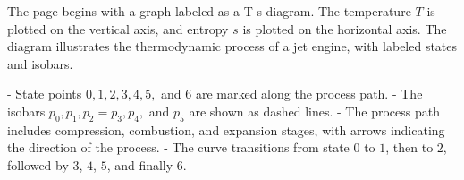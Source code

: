 The page begins with a graph labeled as a T-s diagram. The temperature \( T \) is plotted on the vertical axis, and entropy \( s \) is plotted on the horizontal axis. The diagram illustrates the thermodynamic process of a jet engine, with labeled states and isobars.  

- State points \( 0, 1, 2, 3, 4, 5, \) and \( 6 \) are marked along the process path.  
- The isobars \( p_0, p_1, p_2 = p_3, p_4, \) and \( p_5 \) are shown as dashed lines.  
- The process path includes compression, combustion, and expansion stages, with arrows indicating the direction of the process.  
- The curve transitions from state \( 0 \) to \( 1 \), then to \( 2 \), followed by \( 3 \), \( 4 \), \( 5 \), and finally \( 6 \).